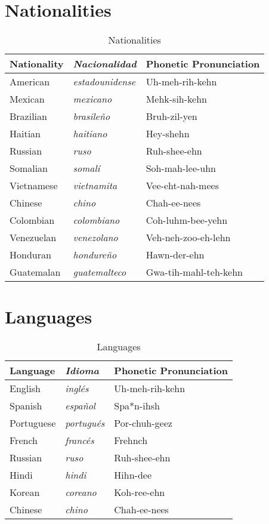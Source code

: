 \section{Nationalities}
\begin{table}[H]
	\center
	\begin{tabular}{lll}
	\toprule
	\textbf{Nationality} & \textbf{\emph{Nacionalidad}} & \textbf{Phonetic Pronunciation} \\
	\midrule
	American & \emph{estadounidense} & Uh-meh-rih-kehn \\
	Mexican & \emph{mexicano} & Mehk-sih-kehn \\
	Brazilian & \emph{brasile\~no} & Bruh-zil-yen \\
	Haitian & \emph{haitiano} & Hey-shehn \\
	Russian & \emph{ruso} & Ruh-shee-ehn \\
	Somalian & \emph{somalí} & Soh-mah-lee-uhn \\
	Vietnamese & \emph{vietnamita} & Vee-eht-nah-mees \\
	Chinese & \emph{chino} & Chah-ee-nees\\
	Colombian & \emph{colombiano} & Coh-luhm-bee-yehn \\
	Venezuelan & \emph{venezolano} & Veh-neh-zoo-eh-lehn \\
	Honduran & \emph{hondure\~no} & Hawn-der-ehn \\
	Guatemalan & \emph{guatemalteco} & Gwa-tih-mahl-teh-kehn \\
	\bottomrule
	\end{tabular}
	\caption{Nationalities}
\end{table}

\section{Languages}
\begin{table}[H]
	\center
	\begin{tabular}{lll}
	\toprule
	\textbf{Language} & \textbf{\emph{Idioma}} & \textbf{Phonetic Pronunciation} \\
	\midrule
	English & \emph{ingl\'es} & Uh-meh-rih-kehn \\
	Spanish & \emph{espa\~nol} & Spa*n-ihsh \\
	Portuguese & \emph{portugués} & Por-chuh-geez \\
	French & \emph{francés} & Frehnch \\
	Russian & \emph{ruso} & Ruh-shee-ehn \\
	Hindi & \emph{hindi} & Hihn-dee \\
	Korean & \emph{coreano} & Koh-ree-ehn \\
	Chinese & \emph{chino} & Chah-ee-nees\\
	\bottomrule
	\end{tabular}
	\caption{Languages}
\end{table}



